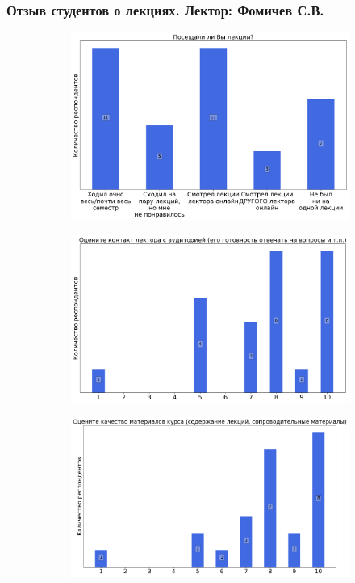     \subsubsection{Отзыв студентов о лекциях. Лектор: Фомичев С.В.}
		\begin{figure}[H]
			\centering
            \begin{subfigure}[b]{0.45\textwidth}
				\centering
				\includegraphics[width=\textwidth]{images/3 course/Теория поля/lecturer-questions-Фомичев С.В.-0.png}
			\end{subfigure}
			\begin{subfigure}[b]{0.45\textwidth}
				\centering
				\includegraphics[width=\textwidth]{images/3 course/Теория поля/lecturer-marks-Фомичев С.В.-0.png}
			\end{subfigure}
			\begin{subfigure}[b]{0.45\textwidth}
				\centering
				\includegraphics[width=\textwidth]{images/3 course/Теория поля/lecturer-marks-Фомичев С.В.-1.png}

\end{subfigure}
\end{figure}
